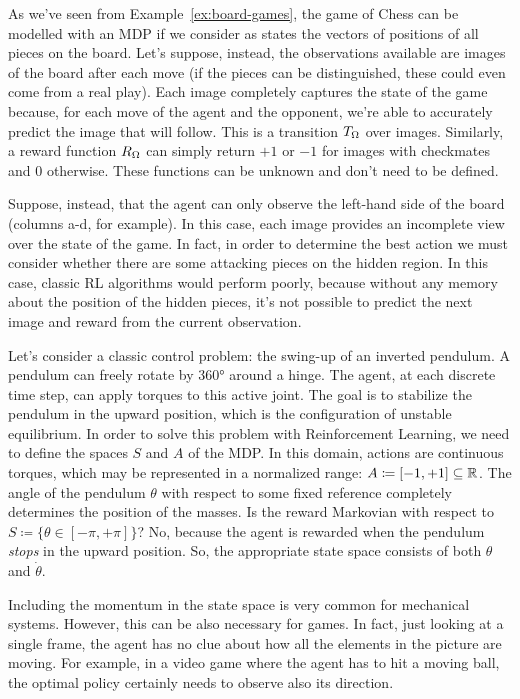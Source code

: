 \begin{example}
	As we've seen from Example~\vref{ex:board-games}, the game of Chess can
	be modelled with an MDP if we consider as states the vectors of positions of
	all pieces on the board. Let's suppose, instead, the observations available
	are images of the board after each move (if the pieces can be distinguished,
	these could even come from a real play). Each image completely captures the
	state of the game because, for each move of the agent and the opponent,
	we're able to accurately predict the image that will follow. This is a
	transition $T_\Omega$ over images. Similarly, a reward function $R_\Omega$ can
	simply return $+1$ or $-1$ for images with checkmates and 0 otherwise. These
	functions can be unknown and don't need to be defined.

	Suppose, instead, that the agent can only observe the left-hand side of the
	board (columns a-d, for example). In this case, each image provides an
	incomplete view over the state of the game. In fact, in order to determine
	the best action we must consider whether there are some attacking pieces on
	the hidden region. In this case, classic RL algorithms would perform poorly,
	because without any memory about the position of the hidden pieces, 
	it's not possible to predict the next image and reward from the current
	observation.
	\label{ex:chess-partial-obs}
\end{example}

\begin{example}
	Let's consider a classic control problem: the swing-up of an inverted
	pendulum. A pendulum can freely rotate by 360° around a hinge. The agent, at
	each discrete time step, can apply torques to this active joint.  The goal
	is to stabilize the pendulum in the upward position, which is the
	configuration of unstable equilibrium. In order to solve this problem with
	Reinforcement Learning, we need to define the spaces $S$ and $A$ of the MDP.
	In this domain, actions are continuous torques, which may be represented in
	a normalized range: $A \coloneqq [-1, +1] \subseteq \mathbb{R}$. The angle of the
	pendulum $\theta$ with respect to some fixed reference completely determines
	the position of the masses. Is the reward Markovian with respect to $S
	\coloneqq \{\theta \in [-\pi, +\pi]\}$? No, because the agent is rewarded
	when the pendulum \emph{stops} in the upward position. So, the appropriate
	state space consists of both $\theta$ and $\dot\theta$.

	Including the momentum in the state space is very common for mechanical
	systems. However, this can be also necessary for games. In fact, just
	looking at a single frame, the agent has no clue about how all the elements
	in the picture are moving.  For example, in a video game where the agent has
	to hit a moving ball, the optimal policy certainly needs to observe also its
	direction.
	\label{ex:motion}
\end{example}


